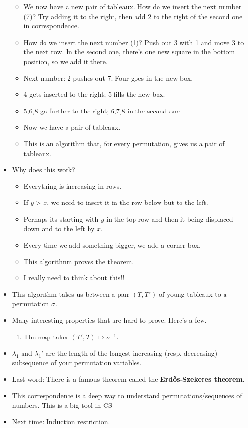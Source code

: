 \documentclass[../notes.tex]{subfiles}
\begin{document}
\begin{itemize}
\begin{itemize}
        \item We now have a new pair of tableaux. How do we insert the next number (7)? Try adding it to the right, then add 2 to the right of the second one in correspondence.
        \item How do we insert the next number (1)? Push out 3 with 1 and move 3 to the next row. In the second one, there's one new square in the bottom position, so we add it there.
        \item Next number: 2 pushes out 7. Four goes in the new box. 
        \item 4 gets inserted to the right; 5 fills the new box.
        \item 5,6,8 go further to the right; 6,7,8 in the second one.
        \item Now we have a pair of tableaux.
        \item This is an algorithm that, for every permutation, gives us a pair of tableaux.
    \end{itemize}
    \item Why does this work?
    \begin{itemize}
        \item Everything is increasing in rows.
        \item If $y>x$, we need to insert it in the row below but to the left.
        \item Perhaps its starting with $y$ in the top row and then it being displaced down and to the left by $x$.
        \item Every time we add something bigger, we add a corner box.
        \item This algorithnm proves the theorem.
        \item I really need to think about this!!
    \end{itemize}
    \item This algorithm takes us between a pair $(T,T')$ of young tableaux to a permutation $\sigma$.
    \item Many interesting properties that are hard to prove. Here's a few.
    \begin{enumerate}
        \item The map takes $(T',T)\mapsto\sigma^{-1}$.
    \end{enumerate}
    \item $\lambda_1$ and $\lambda_1'$ are the length of the longest increasing (resp. decreasing) subsequence of your permutation variables.
    \item Last word: There is a famous theorem called the \textbf{Erd\H{o}s-Szekeres theorem}.
    \item This correspondence is a deep way to understand permutations/sequences of numbers. This is a big tool in CS.
    \item Next time: Induction restriction.
\end{itemize}
\end{document}
